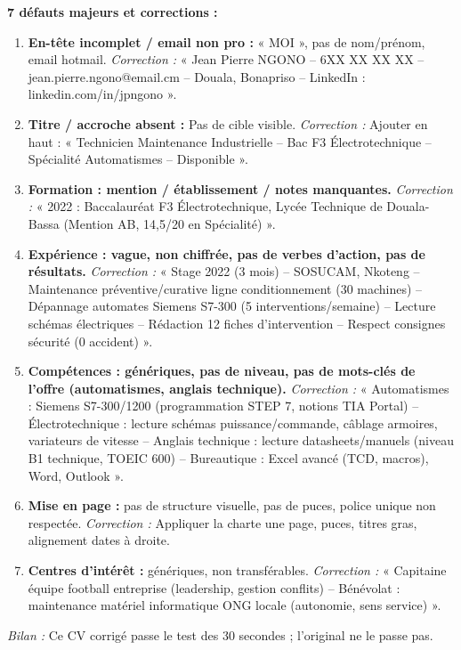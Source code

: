 \documentclass[11pt]{article}
\begin{document}
\begin{corrige}
\textbf{7 défauts majeurs et corrections :}
\begin{enumerate}
    \item \textbf{En-tête incomplet / email non pro :} « MOI », pas de nom/prénom, email hotmail. \textit{Correction :} « Jean Pierre NGONO -- 6XX XX XX XX -- jean.pierre.ngono@email.cm -- Douala, Bonapriso -- LinkedIn : linkedin.com/in/jpngono ».
    \item \textbf{Titre / accroche absent :} Pas de cible visible. \textit{Correction :} Ajouter en haut : « Technicien Maintenance Industrielle -- Bac F3 Électrotechnique -- Spécialité Automatismes -- Disponible ».
    \item \textbf{Formation : mention / établissement / notes manquantes.} \textit{Correction :} « 2022 : Baccalauréat F3 Électrotechnique, Lycée Technique de Douala-Bassa (Mention AB, 14,5/20 en Spécialité) ».
    \item \textbf{Expérience : vague, non chiffrée, pas de verbes d'action, pas de résultats.} \textit{Correction :} « Stage 2022 (3 mois) -- SOSUCAM, Nkoteng -- Maintenance préventive/curative ligne conditionnement (30 machines) -- Dépannage automates Siemens S7-300 (5 interventions/semaine) -- Lecture schémas électriques -- Rédaction 12 fiches d'intervention -- Respect consignes sécurité (0 accident) ».
    \item \textbf{Compétences : génériques, pas de niveau, pas de mots-clés de l'offre (automatismes, anglais technique).} \textit{Correction :} « Automatismes : Siemens S7-300/1200 (programmation STEP 7, notions TIA Portal) -- Électrotechnique : lecture schémas puissance/commande, câblage armoires, variateurs de vitesse -- Anglais technique : lecture datasheets/manuels (niveau B1 technique, TOEIC 600) -- Bureautique : Excel avancé (TCD, macros), Word, Outlook ».
    \item \textbf{Mise en page :} pas de structure visuelle, pas de puces, police unique non respectée. \textit{Correction :} Appliquer la charte une page, puces, titres gras, alignement dates à droite.
    \item \textbf{Centres d'intérêt :} génériques, non transférables. \textit{Correction :} « Capitaine équipe football entreprise (leadership, gestion conflits) -- Bénévolat : maintenance matériel informatique ONG locale (autonomie, sens service) ».
\end{enumerate}
\emph{Bilan :} Ce CV corrigé passe le test des 30 secondes ; l'original ne le passe pas.
\end{corrige}
\end{document}
